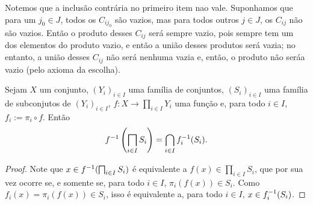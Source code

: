 Notemos que a inclusão contrária no primeiro item nao vale. Suponhamos que para um $j_0 \in J$, todos os $C_{ij_0}$ são vazios, mas para todos outros $j \in J$, os $C_{ij}$ não são vazios. Então o produto desses $C_{ij}$ será sempre vazio, pois sempre tem um dos elementos do produto vazio, e então a união desses produtos será vazia; no entanto, a união desses $C_{ij}$ não será nenhuma vazia e, então, o produto não seráa vazio (pelo axioma da escolha).

\begin{prop}
\label{conj:prop.im.inv.prod}
Sejam $X$ um conjunto, $(Y_i)_{i \in I}$ uma família de conjuntos, $(S_i)_{i \in I}$ uma família de subconjutos de $(Y_i)_{i \in I}$, $f: X \to \prod_{i \in I} Y_i$ uma função e, para todo $i \in I$, $f_i := \pi_i \circ f$. Então
	\begin{equation*}
	f\inv\left( \prod_{i \in I} {S_i} \right) = \bigcap_{i \in I} f_i\inv (S_i).
	\end{equation*}
\end{prop}
\begin{proof}
Note que $x \in f\inv(\prod_{i \in I} {S_i})$ é equivalente a $f(x) \in \prod_{i \in I} {S_i}$, que por sua vez ocorre se, e somente se, para todo $i \in I$, $\pi_i(f(x)) \in S_i$. Como $f_i(x)=\pi_i(f(x)) \in S_i$, isso é equivalente a, para todo $i \in I$, $x \in f_i^{-1} (S_i)$.
\end{proof}










